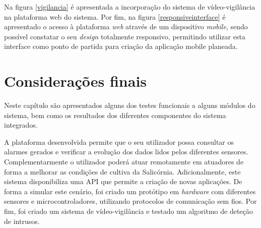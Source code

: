 \newpage

Na figura \ref{vigilancia} é apresentada a incorporação do sistema de vídeo-vigilância na plataforma web do sistema. Por fim, na figura \ref{responsiveinterface} é apresentado o acesso à plataforma \textit{web} através de um dispositivo \textit{mobile}, sendo possível constatar o seu \textit{design} totalmente responsivo, permitindo utilizar esta interface como ponto de partida para criação da aplicação mobile planeada. 




\section{Considerações finais}



Neste capítulo são apresentados alguns dos testes funcionais a alguns módulos do sistema, bem como os resultados dos diferentes componentes do sistema integrados.  

A plataforma desenvolvida permite que o seu utilizador possa consultar os alarmes gerados e verificar a evolução dos dados lidos pelos diferentes sensores. Complementarmente o utilizador poderá atuar remotamente em atuadores de forma a melhorar as condições de cultiva da Salicórnia. Adicionalmente, este sistema disponibiliza uma API que permite a criação de novas aplicações. De forma a simular este cenário, foi criado um protótipo em \textit{hardware} com diferentes sensores e microcontroladores, utilizando protocolos de comunicação sem fios. Por fim, foi criado um sistema de vídeo-vigilância e testado um algoritmo de deteção de intrusos. 


